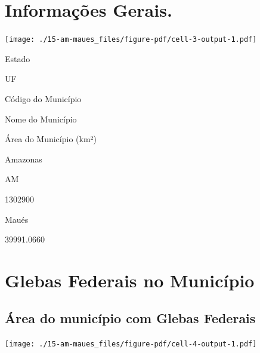 \documentclass[
  letterpaper,
]{report}
\begin{document}
\hypertarget{informauxe7uxf5es-gerais.-1}{%
\section{Informações Gerais.}\label{informauxe7uxf5es-gerais.-1}}

\texttt{[image: ./15-am-maues\_files/figure-pdf/cell-3-output-1.pdf]}

\n  

\n    

\n      

Estado

\n      

UF

\n      

Código do Município

\n      

Nome do Município

\n      

Área do Município (km²)

\n    

\n  

\n  

\n    

\n      

Amazonas

\n      

AM

\n      

1302900

\n      

Maués

\n      

39991.0660

\n    

\n  

\n

\hypertarget{glebas-federais-no-municuxedpio}{%
\section{Glebas Federais no
Município}\label{glebas-federais-no-municuxedpio}}

\hypertarget{uxe1rea-do-municuxedpio-com-glebas-federais}{%
\subsection{Área do município com Glebas
Federais}\label{uxe1rea-do-municuxedpio-com-glebas-federais}}

\texttt{[image: ./15-am-maues\_files/figure-pdf/cell-4-output-1.pdf]}
\end{document}
